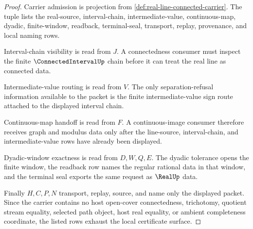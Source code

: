 \begin{proof}
Carrier admission is projection from \autoref{def:real-line-connected-carrier}. The tuple lists the real-source, interval-chain, intermediate-value, continuous-map, dyadic, finite-window, readback, terminal-seal, transport, replay, provenance, and local naming rows.

Interval-chain visibility is read from $J$. A connectedness consumer must inspect the finite $\ConnectedIntervalUp$ chain before it can treat the real line as connected data.

Intermediate-value routing is read from $V$. The only separation-refusal information available to the packet is the finite intermediate-value sign route attached to the displayed interval chain.

Continuous-map handoff is read from $F$. A continuous-image consumer therefore receives graph and modulus data only after the line-source, interval-chain, and intermediate-value rows have already been displayed.

Dyadic-window exactness is read from $D,W,Q,E$. The dyadic tolerance opens the finite window, the readback row names the regular rational data in that window, and the terminal seal exports the same request as $\RealUp$ data.

Finally $H,C,P,N$ transport, replay, source, and name only the displayed packet. Since the carrier contains no host open-cover connectedness, trichotomy, quotient stream equality, selected path object, host real equality, or ambient completeness coordinate, the listed rows exhaust the local certificate surface.
\end{proof}

